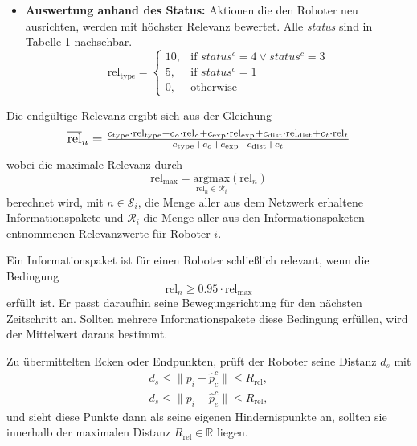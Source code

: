\documentclass[conference]{IEEEtran}
\begin{document}
\begin{itemize}
    \item \textbf{Auswertung anhand des Status:}
    Aktionen die den Roboter neu ausrichten, werden mit höchster Relevanz bewertet. Alle \textit{status} sind in Tabelle 1
    nachsehbar.
    \begin{equation}
        \mathrm{rel}_{\mathrm{type}} =
        \begin{cases}
        10, & \text{if } status^c = 4 \vee status^c = 3 \\
        5,  & \text{if } status^c = 1 \\
        0,  & \text{otherwise}
        \end{cases}
        \label{eq:10}
    \end{equation}
\end{itemize}

Die endgültige Relevanz ergibt sich aus der Gleichung
\begin{equation}
    \scalebox{1.15}{$\overline{\mathrm{rel}}_n = \frac{c_{\mathrm{type}} \cdot \mathrm{rel}_{\mathrm{type}} + c_o \cdot \mathrm{rel}_o + c_{\mathrm{exp}} \cdot \mathrm{rel}_{\mathrm{exp}} + c_{\mathrm{dist}} \cdot \mathrm{rel}_{\mathrm{dist}} + c_t \cdot \mathrm{rel}_t}{c_{\mathrm{type}} + c_o + c_{\mathrm{exp}} + c_{\mathrm{dist}} + c_t}$}
    \label{eq:11}
\end{equation}
wobei die maximale Relevanz durch 
\begin{equation}
    \mathrm{rel}_{\mathrm{max}} = \underset{\mathrm{rel}_n \in \mathcal{R}_i}{\mathrm{argmax}}(\mathrm{rel}_n)
    \label{eq:12}
\end{equation}
berechnet wird, mit $n \in \mathcal{S}_i$, die Menge aller aus dem Netzwerk erhaltene Informationspakete und 
$\mathcal{R}_i$ die Menge aller aus den Informationspaketen entnommenen Relevanzwerte für Roboter $i$.

Ein Informationspaket ist für einen Roboter schließlich relevant, wenn die Bedingung
\begin{equation}
    \mathrm{rel}_n \geq 0.95 \cdot \mathrm{rel}_{\mathrm{max}}
    \label{eq:13}
\end{equation}
erfüllt ist. Er passt daraufhin seine 
Bewegungsrichtung für den nächsten Zeitschritt an. Sollten mehrere Informationspakete 
diese Bedingung erfüllen, wird der Mittelwert daraus bestimmt.

Zu übermittelten Ecken oder Endpunkten, prüft der Roboter seine Distanz $d_s$ mit
\begin{equation}
    \begin{split}
    d_s \leq \| p_i - \hat{p}_c^c \| \leq R_{\mathrm{rel}},\\
    d_s \leq \| p_i - \hat{p}_e^c \| \leq R_{\mathrm{rel}},
    \end{split}
    \label{eq:14}
\end{equation}
und sieht diese Punkte dann als seine eigenen Hindernispunkte an, sollten 
sie innerhalb der maximalen Distanz \( R_{\mathrm{rel}} \in \mathbb{R} \) liegen.
\end{document}
